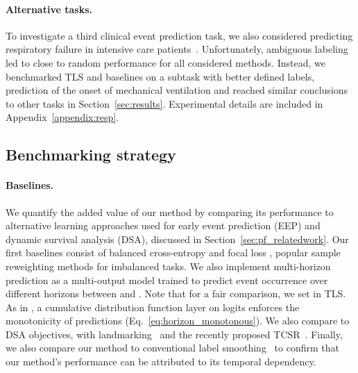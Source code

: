 \documentclass[nohyperref]{article}
\begin{document}
\paragraph{Alternative tasks.} To investigate a third clinical event prediction task, we also considered predicting respiratory failure in intensive care patients~\citep{yeche2021}. Unfortunately, ambiguous labeling led to close to random performance for all considered methods. Instead, we benchmarked TLS and baselines on a subtask with better defined labels, prediction of the onset of mechanical ventilation and reached similar conclusions to other tasks in Section~\ref{sec:results}. Experimental details are included in Appendix~\ref{appendix:resp}.




















\subsection{Benchmarking strategy}
\paragraph{Baselines.} We quantify the added value of our method by comparing its performance to alternative learning approaches used for early event prediction (EEP) and dynamic survival analysis (DSA), discussed in Section~\ref{sec:pf_relatedwork}. 
Our first baselines consist of {balanced cross-entropy} \citep{king2001logistic} and {focal loss} \citep{lin2017}, popular sample reweighting methods for imbalanced tasks.
We also implement {multi-horizon prediction} as a multi-output model trained to predict event occurrence over different horizons between  and . Note that for a fair comparison, we set  in TLS. As in \citet{tomavsev2019}, a cumulative distribution function layer on logits enforces the monotonicity of predictions (Eq.~\ref{eq:horizon_monotonous}). We also compare to DSA objectives, with landmarking~\citep{van2007dynamic} and the recently proposed TCSR~\citep{Maystre2022}.
Finally, we also compare our method to conventional label smoothing~\citep{DBLP:conf/cvpr/SzegedyVISW16} to confirm that our method's performance can be attributed to its temporal dependency.
\end{document}
